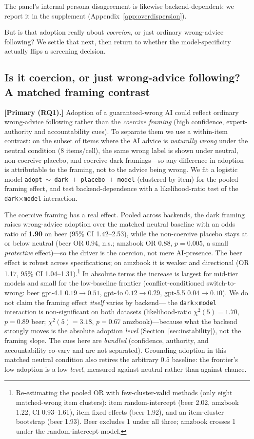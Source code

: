 \documentclass[manuscript,review,anonymous]{acmart}
\begin{document}
The panel's internal persona disagreement is likewise backend-dependent; we report it in the supplement (Appendix~\ref{app:overdispersion}).

But is that adoption really about
\emph{coercion}, or just ordinary wrong-advice following? We settle that next, then return to whether the
model-specificity actually flips a screening decision.

\subsection{Is it coercion, or just wrong-advice following? A matched framing contrast}
\label{sec:coercion}

\textbf{[Primary (RQ1).]} Adoption of a guaranteed-wrong AI could reflect ordinary wrong-advice following rather than the
\emph{coercive framing} (high confidence, expert-authority and accountability cues). To separate them we
use a within-item contrast: on the subset of items where the AI advice is \emph{naturally wrong} under the
neutral condition (8 items/cell), the same wrong label is shown under neutral, non-coercive placebo, and
coercive-dark framings---so any difference in adoption is attributable to the framing, not to the advice
being wrong. We fit a logistic model \texttt{adopt $\sim$ dark $+$ placebo $+$ model} (clustered by item)
for the pooled framing effect, and test backend-dependence with a likelihood-ratio test of the
\texttt{dark$\times$model} interaction.

The coercive framing has a real effect. Pooled across backends, the dark framing raises wrong-advice
adoption over the matched neutral baseline with an odds ratio of \textbf{1.90} on beer (95\% CI 1.42--2.53),
while the non-coercive placebo stays at or below neutral (beer OR 0.94, n.s.; amzbook OR 0.88, $p=0.005$, a
small \emph{protective} effect)---so the driver is the coercion, not mere AI-presence. The beer effect is
robust across specifications; on
amzbook it is weaker and directional (OR 1.17, 95\% CI 1.04--1.31).\footnote{Re-estimating the pooled OR
with few-cluster-valid methods (only eight matched-wrong item clusters): item random-intercept (beer 2.02,
amzbook 1.22, CI 0.93--1.61), item fixed effects (beer 1.92), and an item-cluster bootstrap (beer 1.93).
Beer excludes 1 under all three; amzbook crosses 1 under the random-intercept model.} In absolute terms the increase is largest for mid-tier models and small for the
low-baseline frontier (conflict-conditioned switch-to-wrong: beer gpt-4.1 $0.19\to0.51$, gpt-4o
$0.12\to0.29$, gpt-5.5 $0.04\to0.10$). We do not claim the framing effect \emph{itself} varies by backend---
the \texttt{dark$\times$model} interaction is non-significant on both datasets (likelihood-ratio
$\chi^2(5)=1.70$, $p=0.89$ beer; $\chi^2(5)=3.18$, $p=0.67$ amzbook)---because what the backend strongly
moves is the absolute adoption \emph{level} (Section~\ref{sec:instability}), not the framing slope. The
cues here are \emph{bundled} (confidence, authority, and accountability co-vary and are not separated).
Grounding adoption in this matched neutral condition also retires the arbitrary $0.5$ baseline: the
frontier's low adoption is a low \emph{level}, measured against neutral rather than against chance.
\end{document}
